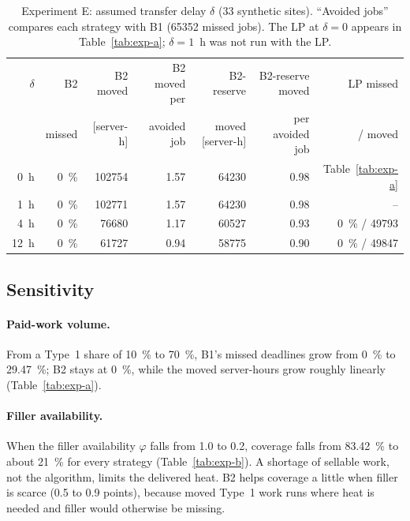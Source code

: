 \begin{table}[ht]
  \centering
  \caption{Experiment E: assumed transfer delay $\delta$ (33 synthetic sites).
    ``Avoided jobs'' compares each strategy with B1 (\num{65352} missed jobs).
    The LP at $\delta=0$ appears in Table~\ref{tab:exp-a}; $\delta=1$~h was not run with the LP.}
  \label{tab:exp-e}
  \small
  \setlength{\tabcolsep}{4pt}
  \begin{tabular}{rrrrrrr}
    \toprule
    $\delta$ & B2 & B2 moved & B2 moved per & B2-reserve & B2-reserve moved & LP missed \\
    & missed & [server-h] & avoided job & moved [server-h] & per avoided job & / moved \\
    \midrule
    \qty{0}{h} & \qty{0}{\percent} & \num{102754} & 1.57 & \num{64230} & 0.98 & Table~\ref{tab:exp-a} \\
    \qty{1}{h} & \qty{0}{\percent} & \num{102771} & 1.57 & \num{64230} & 0.98 & -- \\
    \qty{4}{h} & \qty{0}{\percent} & \num{76680} & 1.17 & \num{60527} & 0.93 & \qty{0}{\percent} / \num{49793} \\
    \qty{12}{h} & \qty{0}{\percent} & \num{61727} & 0.94 & \num{58775} & 0.90 & \qty{0}{\percent} / \num{49847} \\
    \bottomrule
  \end{tabular}
\end{table}

\subsection{Sensitivity}
\label{sec:eval-sensitivity}

\paragraph{Paid-work volume.} From a Type~1 share of \qty{10}{\percent} to \qty{70}{\percent}, B1's
missed deadlines grow from \qty{0}{\percent} to \qty{29.47}{\percent}; B2 stays at
\qty{0}{\percent}, while the moved server-hours grow roughly linearly (Table~\ref{tab:exp-a}).

\paragraph{Filler availability.} When the filler availability $\varphi$ falls from 1.0 to 0.2,
coverage falls from \qty{83.42}{\percent} to about \qty{21}{\percent} for every strategy
(Table~\ref{tab:exp-b}). A shortage of sellable work, not the algorithm, limits the delivered heat.
B2 helps coverage a little when filler is scarce (0.5 to 0.9 points), because moved Type~1 work
runs where heat is needed and filler would otherwise be missing.

